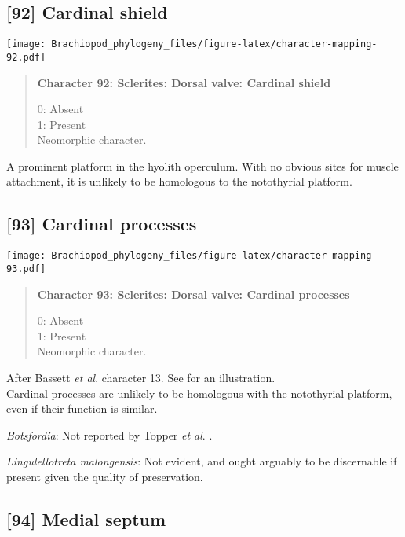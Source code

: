 \documentclass[openany]{book}
\theoremstyle{definition}
\theoremstyle{definition}
\theoremstyle{definition}
\theoremstyle{remark}
\begin{document}
\subsection*{{[}92{]} Cardinal shield}\label{cardinal-shield}

\texttt{[image: Brachiopod\_phylogeny\_files/figure-latex/character-mapping-92.pdf]}

\begin{quote}
\textbf{Character 92: Sclerites: Dorsal valve: Cardinal shield}

0: Absent\\
1: Present\\
Neomorphic character.
\end{quote}

A prominent platform in the hyolith operculum. With no obvious sites for
muscle attachment, it is unlikely to be homologous to the notothyrial
platform.

\subsection*{{[}93{]} Cardinal processes}\label{cardinal-processes}

\texttt{[image: Brachiopod\_phylogeny\_files/figure-latex/character-mapping-93.pdf]}

\begin{quote}
\textbf{Character 93: Sclerites: Dorsal valve: Cardinal processes}

0: Absent\\
1: Present\\
Neomorphic character.
\end{quote}

After Bassett \emph{et al}.
\citeyearpar{Bassett2001Functionalmorphology} character 13. See
\citet{MartiMus2005} for an illustration.\\
Cardinal processes are unlikely to be homologous with the notothyrial
platform, even if their function is similar.

\hypertarget{Botsfordia-coding-93}{}
\emph{Botsfordia}: Not reported by Topper \emph{et al}.
\citeyearpar{Topper2013Reappraisalof}.

\hypertarget{Lingulellotreta_malongensis-coding-93}{}
\emph{Lingulellotreta malongensis}: Not evident, and ought arguably to
be discernable if present given the quality of preservation.

\subsection*{{[}94{]} Medial septum}\label{medial-septum}
\end{document}
